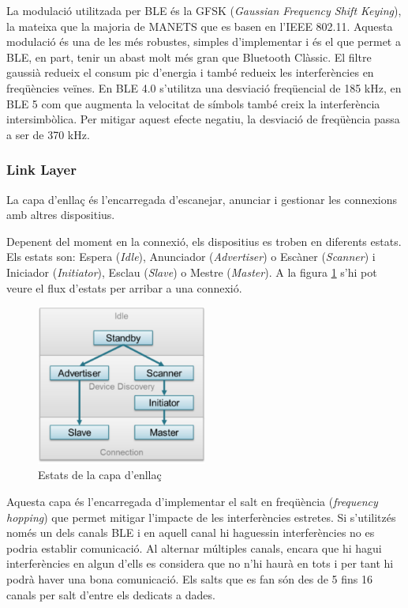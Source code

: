 La modulació utilitzada per BLE és la GFSK (\textit{Gaussian Frequency Shift Keying}), la mateixa que la majoria de MANETS que es basen en l'IEEE 802.11.
Aquesta modulació és una de les més robustes, simples d'implementar i és el que permet a BLE, en part, tenir un abast molt més gran que Bluetooth Clàssic.
El filtre gaussià redueix el consum pic d'energia \cite{BLE_Review} i també redueix les interferències en freqüències veïnes.
En BLE 4.0 s'utilitza una desviació freqüencial de 185 kHz, en BLE 5 com que augmenta la velocitat de símbols també creix la interferència intersimbòlica.
Per mitigar aquest efecte negatiu, la desviació de freqüència passa a ser de 370 kHz.


\subsubsection{Link Layer}
La capa d'enllaç és l'encarregada d'escanejar, anunciar i gestionar les connexions amb altres dispositius.

Depenent del moment en la connexió, els dispositius es troben en diferents estats.
Els estats son: Espera (\textit{Idle}), Anunciador (\textit{Advertiser}) o Escàner (\textit{Scanner}) i Iniciador (\textit{Initiator}), Esclau (\textit{Slave}) o Mestre (\textit{Master}).
A la figura \ref{Link_State_Diagram} s'hi pot veure el flux d'estats per arribar a una connexió.

\begin{figure}[!h]
	\begin{center}
		\includegraphics[width=0.5\textwidth]{./images/gap_state_diagram.png}
		\caption{Estats de la capa d'enllaç \cite{Link_Layer_states}}
		\label{Link_State_Diagram}
	\end{center}
\end{figure}

Aquesta capa és l'encarregada d'implementar el salt en freqüència (\textit{frequency hopping}) que permet mitigar l'impacte de les interferències estretes.
Si s'utilitzés només un dels canals BLE i en aquell canal hi haguessin interferències no es podria establir comunicació.
Al alternar múltiples canals, encara que hi hagui interferències en algun d'ells es considera que no n'hi haurà en tots i per tant hi podrà haver una bona comunicació.
Els salts que es fan són des de 5 fins 16 canals per salt d'entre els dedicats a dades.

